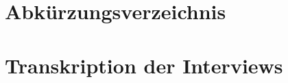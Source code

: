 \documentclass[
  paper=a4, %
  11pt, %
  bibliography=totoc, %
  parskip=off, %
  oneside, %
  article, %
  accentcolor=tud8b, %
  colorback, %
  type=dr, %
  dr=ing %
]{tudthesis}
\begin{document}
\clearpage




%

\singlespacing
\printbibliography[title=Literaturverzeichnis, heading=bibliography]

\clearpage





\appendix


\section{Abkürzungsverzeichnis}
\clearpage
\section{Transkription der Interviews}
\end{document}
